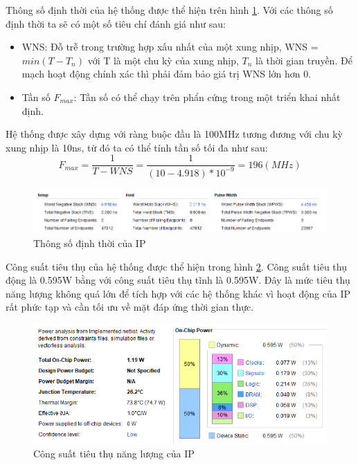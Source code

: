 Thông số định thời của hệ thống được thể hiện trên hình \ref{fig:ipTiming}. Với các thông số định thời ta sẽ có một số tiêu chí đánh giá như sau:
\begin{itemize}
	\item WNS: Đỗ trễ trong trường hợp xấu nhất của một xung nhịp, WNS = $min(T-T_n)$ với T là một chu kỳ của xung nhịp, $T_n$ là thời gian truyền. Để mạch hoạt động chính xác thì phải đảm bảo giá trị WNS lớn hơn 0.
	\item Tần số $F_{max}$: Tần số có thể chạy trên phẩn cứng trong một triển khai nhất định.
\end{itemize}
Hệ thống được xây dựng với ràng buộc đầu là 100MHz tương đương với chu kỳ xung nhịp là 10ns, từ đó ta có thể tính tần số tối đa như sau:
\begin{equation*}
	F_{max} = \frac{1}{T - WNS} = \frac{1}{(10 - 4.918)*10^{-9}} = 196   (MHz) 
\end{equation*}

\begin{figure}[!ht]
	\centering
	\includegraphics[width=\linewidth]{figures/ipTiming.png}
	\caption{Thông số định thời của IP}
	\label{fig:ipTiming}
\end{figure}

Công suất tiêu thụ của hệ thống được thể hiện trong hình \ref{fig:power}. Công suất tiêu thụ động là 0.595W bằng với công suất tiêu thụ tĩnh là 0.595W. Đây là mức tiêu thụ năng lượng không quá lớn để tích hợp với các hệ thống khác vì hoạt động của IP rất phức tạp và cần tối ưu về mặt đáp ứng thời gian thực.

\begin{figure}[!ht]
	\centering
	\includegraphics[width=\linewidth]{figures/power.png}
	\caption{Công suất tiêu thụ năng lượng của IP}
	\label{fig:power}
\end{figure}



